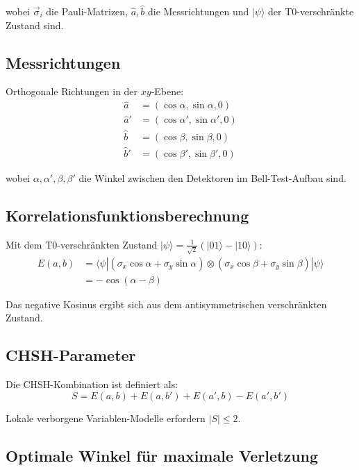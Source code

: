 \documentclass[12pt,a4paper]{article}
\begin{document}
		wobei $\vec{\sigma}_i$ die Pauli-Matrizen, $\hat{a}, \hat{b}$ die Messrichtungen und $|\psi\rangle$ der T0-verschr\"ankte Zustand sind.
		
		\subsection{Messrichtungen}
		
		Orthogonale Richtungen in der $xy$-Ebene:
		\begin{align}
			\hat{a} &= (\cos \alpha, \sin \alpha, 0) \\
			\hat{a}' &= (\cos \alpha', \sin \alpha', 0) \\
			\hat{b} &= (\cos \beta, \sin \beta, 0) \\
			\hat{b}' &= (\cos \beta', \sin \beta', 0)
		\end{align}
		
		wobei $\alpha, \alpha', \beta, \beta'$ die Winkel zwischen den Detektoren im Bell-Test-Aufbau sind.
		
		\subsection{Korrelationsfunktionsberechnung}
		
		Mit dem T0-verschr\"ankten Zustand $|\psi\rangle = \frac{1}{\sqrt{2}}(|01\rangle - |10\rangle)$:
		\begin{align}
			E(a,b) &= \langle \psi | (\sigma_x \cos\alpha + \sigma_y \sin\alpha) \otimes (\sigma_x \cos\beta + \sigma_y \sin\beta) | \psi \rangle \\
			&= -\cos(\alpha - \beta)
		\end{align}
		
		Das negative Kosinus ergibt sich aus dem antisymmetrischen verschr\"ankten Zustand.
		
		\subsection{CHSH-Parameter}
		
		Die CHSH-Kombination ist definiert als:
		\begin{equation}
			S = E(a,b) + E(a,b') + E(a',b) - E(a',b')
		\end{equation}
		
		Lokale verborgene Variablen-Modelle erfordern $|S| \leq 2$.
		
		\subsection{Optimale Winkel f\"ur maximale Verletzung}
		
\end{document}
